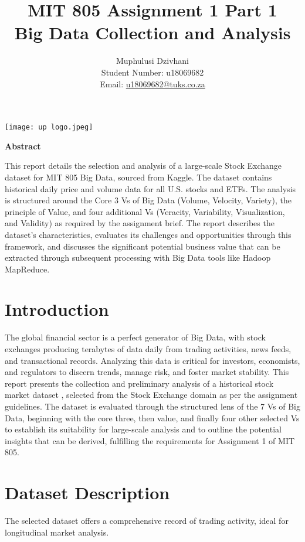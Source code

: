 \documentclass[12pt,a4paper]{article}
\title{MIT 805 Assignment 1 Part 1 \\ Big Data Collection and Analysis}
\author{Muphulusi Dzivhani \\ Student Number: u18069682 \\ Email: \url{u18069682@tuks.co.za}}
\makeatletter
\renewcommand{\maketitle}{
  \begin{center}
    \texttt{[image: up logo.jpeg]}\par\vspace{1em}
    {\LARGE \bfseries \@title \par}
    \vspace{1em}
    {\large \@author \par}
    \vspace{1em}
  \end{center}
}
\renewenvironment{abstract}{
  \begin{center}
    \bfseries Abstract
  \end{center}
}{\par\vspace{1em}}
\makeatother
\begin{document}
\maketitle


\begin{abstract}
This report details the selection and analysis of a large-scale Stock Exchange dataset for MIT 805 Big Data, sourced from Kaggle. The dataset contains historical daily price and volume data for all U.S. stocks and ETFs. The analysis is structured around the Core 3 Vs of Big Data (Volume, Velocity, Variety), the principle of Value, and four additional Vs (Veracity, Variability, Visualization, and Validity) as required by the assignment brief. The report describes the dataset's characteristics, evaluates its challenges and opportunities through this framework, and discusses the significant potential business value that can be extracted through subsequent processing with Big Data tools like Hadoop MapReduce.
\end{abstract}

\section{Introduction}
The global financial sector is a perfect generator of Big Data, with stock exchanges producing terabytes of data daily from trading activities, news feeds, and transactional records. Analyzing this data is critical for investors, economists, and regulators to discern trends, manage risk, and foster market stability. This report presents the collection and preliminary analysis of a historical stock market dataset \cite{ref1}, selected from the Stock Exchange domain as per the assignment guidelines. The dataset is evaluated through the structured lens of the 7 Vs of Big Data, beginning with the core three, then value, and finally four other selected Vs to establish its suitability for large-scale analysis and to outline the potential insights that can be derived, fulfilling the requirements for Assignment 1 of MIT 805.

\section{Dataset Description}
The selected dataset offers a comprehensive record of trading activity, ideal for longitudinal market analysis.
\end{document}
